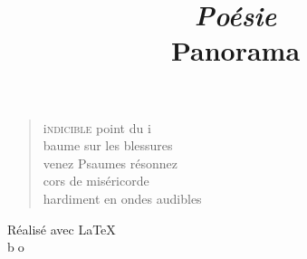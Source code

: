 \documentclass[a4paper,12pt,openright]{book}
\begin{document}
\newcommand{\lb}[1]{\color{lightblue} #1}

  \newcommand{\bleu}[1]{\color{bleu} #1}

\pagestyle{empty}
\title{\hbox{}
       \huge\bf
       \textit{Poésie}       
\\
  {\bleu Panorama}
  \\ 
       }
\date{}
\maketitle
\begin{verse}
\settowidth{\versewidth}{de nouveau de nous}
\vspace{1cm}
\section{}
\vspace{1cm}
{\lettrine[lines=1]{\textcolor[gray]{0.6}{i}}{\space ndicible} point du i}\\
baume sur les blessures\\
venez Psaumes résonnez\\
cors de miséricorde\\
hardiment en ondes audibles


\vspace{2cm}
\begin{center}
\end{center}



\end{verse}





\vfill




\begin{center}
\baselineskip=60pt 

\vspace*{12.5cm}
Réalisé avec \LaTeX
\\
\vspace*{1.5cm}
{\lb \LARGE \textcircled {bo}}
\end{center}
\end{document}
